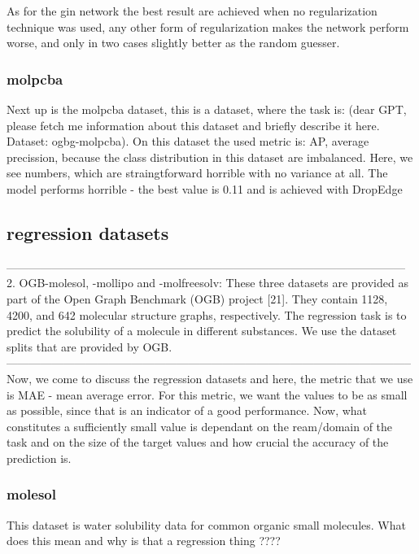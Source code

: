 As for the \ac{gin} network the best result are achieved when no regularization technique was used, any other form of regularization makes the network perform worse, and only in two cases slightly better as the random guesser.


\subsubsection{molpcba}
Next up is the molpcba dataset, this is a dataset, where the task is: (dear GPT, please fetch me information about this dataset and briefly describe it here. Dataset: ogbg-molpcba). On this dataset the used metric is: AP, average precission, because the class distribution in this dataset are imbalanced. Here, we see numbers, which are straingtforward horrible with no variance at all. The model performs horrible - the best value is 0.11 and is achieved with DropEdge



\subsection{regression datasets}

---------------------------------------------------------------------------------------------------------
2. OGB-molesol, -mollipo and -molfreesolv: These three datasets are provided as part
of the Open Graph Benchmark (OGB) project [21]. They contain 1128, 4200, and 642
molecular structure graphs, respectively. The regression task is to predict the solubility
of a molecule in different substances. We use the dataset splits that are provided by
OGB.
-----------------------------------------------------------------------------------------------------------
Now, we come to discuss the regression datasets and here, the metric that we use is MAE - mean average error. For this metric, we want the values to be as small as possible, since that is an indicator of a good performance. Now, what constitutes a sufficiently small value is dependant on the ream/domain of the task and on the size of the target values and how crucial the accuracy of the prediction is.

\subsubsection{molesol}
This dataset is water solubility data for common organic small molecules. What does this mean and why is that a regression thing ????

